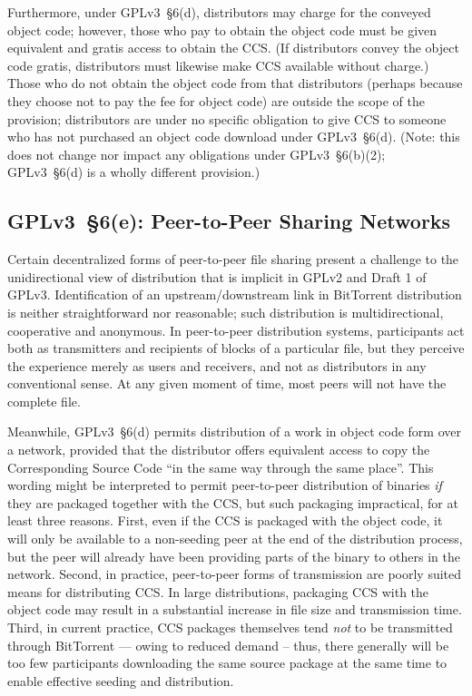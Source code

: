 
Furthermore, under GPLv3~\S6(d), distributors may charge for the conveyed
object code; however, those who pay to obtain the object code must be given
equivalent and gratis access to obtain the CCS.  (If distributors convey the
object code gratis, distributors must likewise make CCS available without
charge.)  Those who do not obtain the object code from that distributors
(perhaps because they choose not to pay the fee for object code) are outside
the scope of the provision; distributors are under no specific obligation to
give CCS to someone who has not purchased an object code download under
GPLv3~\S6(d).  (Note: this does not change nor impact any obligations under
GPLv3~\S6(b)(2); GPLv3~\S6(d) is a wholly different provision.)

\subsection{GPLv3~\S6(e): Peer-to-Peer Sharing Networks}

Certain decentralized forms of peer-to-peer file sharing present a challenge
to the unidirectional view of distribution that is implicit in GPLv2 and
Draft 1 of GPLv3.  Identification of an upstream/downstream link in
BitTorrent distribution is neither straightforward nor reasonable; such
distribution is multidirectional, cooperative and anonymous.  In peer-to-peer
distribution systems, participants act both as transmitters and recipients of
blocks of a particular file, but they perceive the experience merely as users
and receivers, and not as distributors in any conventional sense.  At any
given moment of time, most peers will not have the complete file.

Meanwhile, GPLv3~\S6(d) permits distribution of a work in object code form
over a network, provided that the distributor offers equivalent access to
copy the Corresponding Source Code ``in the same way through the same
place''.  This wording might be interpreted to permit peer-to-peer
distribution of binaries \textit{if} they are packaged together with the CCS,
but such packaging impractical, for at least three reasons.  First, even if
the CCS is packaged with the object code, it will only be available to a
non-seeding peer at the end of the distribution process, but the peer will
already have been providing parts of the binary to others in the network.
Second, in practice, peer-to-peer forms of transmission are poorly suited
means for distributing CCS.  In large distributions, packaging CCS with the
object code may result in a substantial increase in file size and
transmission time.  Third, in current practice, CCS packages themselves tend
\textit{not} to be transmitted through BitTorrent --- owing to reduced demand
-- thus, there generally will be too few participants downloading the same
source package at the same time to enable effective seeding and distribution.

